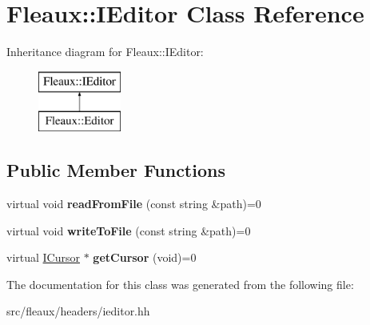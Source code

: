\hypertarget{classFleaux_1_1IEditor}{}\section{Fleaux\+:\+:I\+Editor Class Reference}
\label{classFleaux_1_1IEditor}
Inheritance diagram for Fleaux\+:\+:I\+Editor\+:\begin{figure}[H]
\begin{center}
\leavevmode
\includegraphics[height=2.000000cm]{classFleaux_1_1IEditor}
\end{center}
\end{figure}
\subsection*{Public Member Functions}
\begin{DoxyCompactItemize}
\item 
\hypertarget{classFleaux_1_1IEditor_af90c1eec6bebbc836bb249b21171ea5d}{}virtual void {\bfseries read\+From\+File} (const string \&path)=0\label{classFleaux_1_1IEditor_af90c1eec6bebbc836bb249b21171ea5d}

\item 
\hypertarget{classFleaux_1_1IEditor_a4ff158a235ed9991af521f08e7cef58e}{}virtual void {\bfseries write\+To\+File} (const string \&path)=0\label{classFleaux_1_1IEditor_a4ff158a235ed9991af521f08e7cef58e}

\item 
\hypertarget{classFleaux_1_1IEditor_adbed8262a17bf6e261026d3f4d15486e}{}virtual \hyperlink{classFleaux_1_1ICursor}{I\+Cursor} $\ast$ {\bfseries get\+Cursor} (void)=0\label{classFleaux_1_1IEditor_adbed8262a17bf6e261026d3f4d15486e}

\end{DoxyCompactItemize}


The documentation for this class was generated from the following file\+:\begin{DoxyCompactItemize}
\item 
src/fleaux/headers/ieditor.\+hh\end{DoxyCompactItemize}
